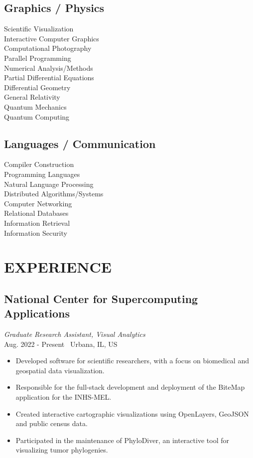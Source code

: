 \documentclass[11pt,twocolumn]{article}
\begin{document}
\subsection*{{Graphics / Physics}}
Scientific Visualization\\
Interactive Computer Graphics\\
Computational Photography\\
Parallel Programming\\
Numerical Analysis/Methods\\
Partial Differential Equations\\
Differential Geometry\\
General Relativity\\
Quantum Mechanics\\
Quantum Computing\\

\subsection*{{Languages / Communication}}
Compiler Construction\\
Programming Languages\\
Natural Language Processing\\
Distributed Algorithms/Systems\\
Computer Networking\\
Relational Databases\\
Information Retrieval\\
Information Security\\

\newpage

\section*{\textnormal{EXPERIENCE}}

\subsection*{National Center for Supercomputing Applications}
\textit{Graduate Research Assistant, Visual Analytics} \\
Aug. 2022 - Present \textbullet\ Urbana, IL, US

\begin{itemize}
\item Developed software for scientific researchers, with a focus on biomedical and geospatial data visualization.
\item Responsible for the full-stack development and deployment of the BiteMap application for the INHS-MEL.
\item Created interactive cartographic visualizations using OpenLayers, GeoJSON and public census data.
\item Participated in the maintenance of PhyloDiver, an interactive tool for visualizing tumor phylogenies.
\end{itemize}
\end{document}
